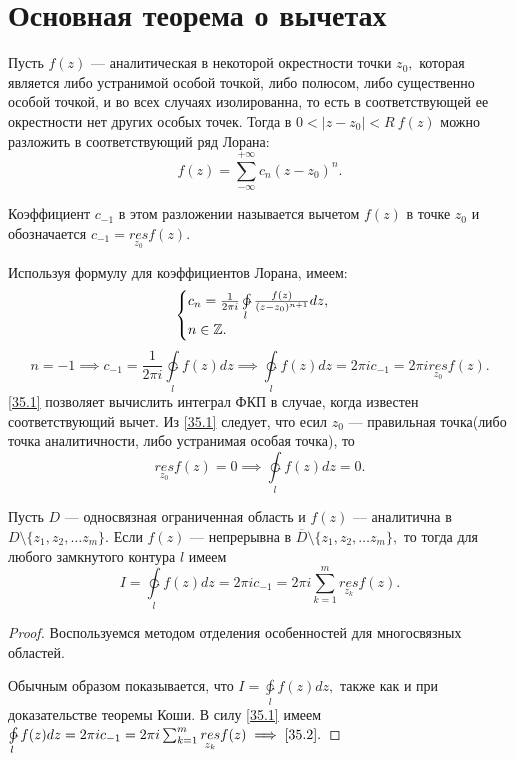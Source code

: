 \documentclass[../../main.tex]{subfiles}
\begin{document}
\section{Основная теорема о вычетах}

	Пусть $f(z)$ --- аналитическая в некоторой окрестности точки $z_0,$ которая является либо устранимой особой точкой,
	либо полюсом, либо существенно особой точкой, и во всех случаях изолированна, то есть в соответствующей ее окрестности нет других особых точек. Тогда в $0 < |z-z_0| < R \ f(z)$ можно разложить в соответствующий ряд Лорана:
	\[
		f(z) = \sum_{-\infty}^{+\infty}c_n(z-z_0)^n.
	\]
	
	Коэффициент $c_{-1}$ в этом разложении называется вычетом $f(z)$ в точке $z_0$ и обозначается 
	$c_{-1} = \underset{z_0}{res} f(z).$
	
	Используя формулу для коэффициентов Лорана, имеем:
	\[
		\begin{cases}
		c_n = \frac{1}{2\pi i} \ointctrclockwise\limits_{l} \frac{f(z)}{(z - z_0)^{n+1}}dz,\\
		n \in \Z.
		\end{cases}
	\]
	\begin{equation} \label{35.1}
		n = -1 \implies c_{-1} = \frac{1}{2\pi i} \ointctrclockwise\limits_{l} f(z)dz \implies 
		\ointctrclockwise\limits_{l} f(z)dz = 2\pi i c_{-1} = 2 \pi i \underset{z_0}{res} f(z).
	\end{equation}
	\eqref{35.1} позволяет вычислить интеграл ФКП в случае, когда известен соответствующий вычет. Из \eqref{35.1} следует, что есил $z_0$ --- правильная точка(либо точка аналитичности, либо устранимая особая точка), то 
	\[
		\underset{z_0}{res}f(z) = 0 \implies 
		\ointctrclockwise\limits_{l} f(z)dz = 0.
	\]
	
	\begin{thm}
		Пусть $D$ --- односвязная ограниченная область и $f(z)$ --- аналитична в $D \setminus\{z_1, z_2, \ldots z_m\}.$
		Если  $f(z)$ --- непрерывна в $\overline{D}\setminus\{z_1, z_2, \ldots z_m\},$ 
		то тогда для любого замкнутого контура $l$ имеем
		\begin{equation} \label{35.2}
			I = \ointctrclockwise\limits_{l} f(z)dz = 2\pi i c_{-1} = 2 \pi i \sum_{k=1}^{m}\underset{z_k}{res} f(z).
		\end{equation}
	\end{thm}	
	\begin{proof}
		Воспользуемся методом отделения особенностей для многосвязных областей.
		
		Обычным образом показывается, что $I = \ointctrclockwise\limits_{l} f(z)dz,$ также как и при доказательстве теоремы Коши. 
		В силу \eqref{35.1} имеем $\ointctrclockwise\limits_{l} f(z)dz = 2\pi i c_{-1} = 2 \pi i \sum_{k=1}^{m}\underset{z_k}{res} f(z) \implies \eqref{35.2}.$
	\end{proof}	
\end{document}
